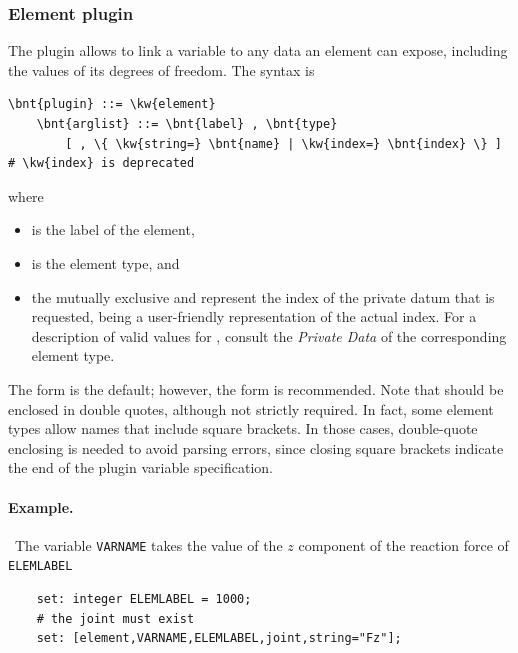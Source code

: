 \subsubsection{Element plugin}
The  plugin allows to link a variable to any data an element
can expose, including the values of its degrees of freedom.
The syntax is
\begin{Verbatim}[commandchars=\\\{\}]
    \bnt{plugin} ::= \kw{element}
    \bnt{arglist} ::= \bnt{label} , \bnt{type}
        [ , \{ \kw{string=} \bnt{name} | \kw{index=} \bnt{index} \} ] # \kw{index} is deprecated
\end{Verbatim}
where
\begin{itemize}
\item {} is the label of the element,
\item {} is the element type, and
\item the mutually exclusive  and  represent the index
of the private datum that is requested,  being a user-friendly
representation of the actual index.
For a description of valid values for , consult the \emph{Private Data} of the corresponding element type.
\end{itemize}
The  form is the default; however, the  form is recommended.
Note that  should be enclosed in double quotes,
although not strictly required.
In fact, some element types allow names that include square brackets.
In those cases, double-quote enclosing is needed to avoid parsing errors,
since closing square brackets indicate the end
of the plugin variable specification.

\paragraph{Example.} \
The variable \texttt{VARNAME} takes the value of the $z$ component 
of the reaction force of \kw{joint} \texttt{ELEMLABEL}
\begin{verbatim}
    set: integer ELEMLABEL = 1000;
    # the joint must exist
    set: [element,VARNAME,ELEMLABEL,joint,string="Fz"];
\end{verbatim}



